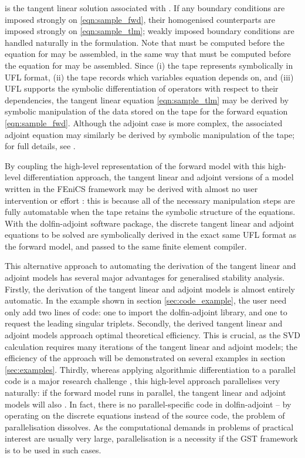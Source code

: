 \documentclass{siamltex}
\begin{document}
is the tangent linear solution associated with . If any boundary conditions are imposed strongly
on \eqref{eqn:sample_fwd}, their homogenised counterparts are imposed strongly on \eqref{eqn:sample_tlm}; weakly imposed
boundary conditions are handled naturally in the formulation. Note that  must be computed before 
the equation for  may be assembled, in the same way that  must be computed before the equation for
 may be assembled. Since (i) the tape represents  symbolically in UFL format, (ii) the tape records which variables
 equation  depends on, and (iii) UFL supports the symbolic differentiation
of operators with respect to their dependencies, the tangent linear equation \eqref{eqn:sample_tlm} may be derived by symbolic manipulation of the
data stored on the tape for the forward equation \eqref{eqn:sample_fwd}. 
Although the adjoint case is more complex, the associated adjoint equation may similarly be
derived by symbolic manipulation of the tape; for full details, see \cite{farrell2012b}.

By coupling the high-level representation of the forward model with this high-level differentiation approach,
the tangent linear and adjoint versions of a model written in the FEniCS framework may be derived with almost no user
intervention or effort \cite{farrell2012b}: this is because all of the necessary manipulation steps are fully automatable when
the tape retains the symbolic structure of the equations. With the dolfin-adjoint software package, the discrete tangent linear and adjoint equations
to be solved are symbolically derived in the exact same UFL format as the forward model, and passed to the same finite element
compiler.

This alternative approach to automating the derivation of the tangent linear and adjoint models has several major
advantages for generalised stability analysis. Firstly, the derivation of the tangent linear and adjoint models is
almost entirely automatic. In the example shown in section \ref{sec:code_example}, the user need only add two lines of
code: one to import the dolfin-adjoint library, and one to request the leading singular triplets. Secondly, the derived
tangent linear and adjoint models approach optimal theoretical efficiency. This is crucial, as the
SVD calculation requires many iterations of the tangent linear and adjoint models; the efficiency of the approach will be
demonstrated on several examples in section \ref{sec:examples}. Thirdly, whereas applying algorithmic
differentiation to a parallel code is a major research challenge \cite{utke2009,forster2011}, this high-level approach
parallelises very naturally: if the forward model runs in parallel, the tangent linear and adjoint models will also \cite{farrell2012b}. In
fact, there is no parallel-specific code in dolfin-adjoint -- by operating on the discrete
equations instead of the source code, the problem of parallelisation dissolves. As the computational demands in problems
of practical interest are usually very large, parallelisation is a necessity if the GST framework is to be used in such
cases.
\end{document}
